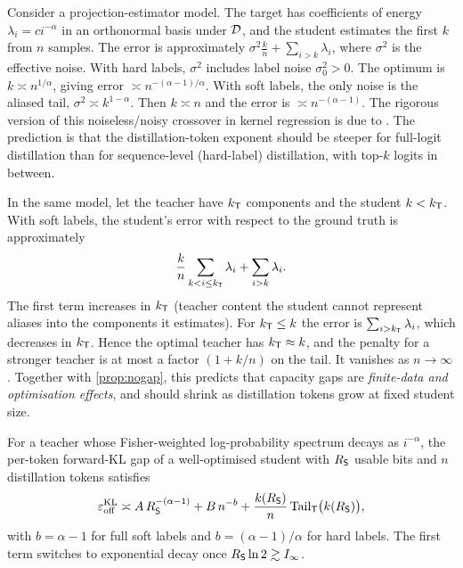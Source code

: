 \begin{heuristic}\label{heur:data}
Consider a projection-estimator model. The target has coefficients of energy $\lambda_i=ci^{-\alpha}$ in
an orthonormal basis under $\mathcal{D}$, and the student estimates the first $k$ from $n$ samples. The error is
approximately $\sigma^2\frac kn+\sum_{i>k}\lambda_i$, where $\sigma^2$ is the effective noise.
With hard labels, $\sigma^2$ includes label noise $\sigma^2_0>0$. The optimum is $k\asymp n^{1/\alpha}$, giving
error $\asymp n^{-(\alpha-1)/\alpha}$.
With soft labels, the only noise is the aliased tail, $\sigma^2\asymp k^{1-\alpha}$. Then $k\asymp n$ and the
error is $\asymp n^{-(\alpha-1)}$.
The rigorous version of this noiseless/noisy crossover in kernel regression is due to
\citet{cui2021generalization}. The prediction is that the distillation-token exponent should be
steeper for full-logit distillation than for sequence-level (hard-label) distillation, with top-$k$
logits in between.
\end{heuristic}

\begin{heuristic}\label{heur:gap}
In the same model, let the teacher have $k_{\mathsf{T}}$ components and the student $k<k_{\mathsf{T}}$. With soft labels,
the student's error with respect to the ground truth is approximately
\[
\frac kn\sum_{k<i\le k_{\mathsf{T}}}\lambda_i+\sum_{i>k}\lambda_i .
\]
The first term increases in $k_{\mathsf{T}}$ (teacher content the student cannot represent aliases into the
components it estimates). For $k_{\mathsf{T}}\le k$ the error is $\sum_{i>k_{\mathsf{T}}}\lambda_i$, which decreases in $k_{\mathsf{T}}$.
Hence the optimal teacher has $k_{\mathsf{T}}\approx k$, and the penalty for a stronger teacher is at most a factor
$(1+k/n)$ on the tail. It vanishes as $n\to\infty$. Together with \cref{prop:nogap}, this predicts that
capacity gaps are \emph{finite-data and optimisation effects}, and should shrink as distillation tokens
grow at fixed student size.
\end{heuristic}

\begin{conjecture}\label{conj:law}
For a teacher whose Fisher-weighted log-probability spectrum decays as $i^{-\alpha}$, the per-token
forward-KL gap of a well-optimised student with $R_{\mathsf{S}}$ usable bits and $n$ distillation tokens satisfies
\[
\varepsilon_{\mathrm{off}}^{\mathrm{KL}}\asymp A\,R_{\mathsf{S}}^{-(\alpha-1)}+B\,n^{-b}+\frac{k(R_{\mathsf{S}})}n\,\mathrm{Tail}_{\mathsf{T}}\big(k(R_{\mathsf{S}})\big),
\]
with $b=\alpha-1$ for full soft labels and $b=(\alpha-1)/\alpha$ for hard labels. The first term switches
to exponential decay once $R_{\mathsf{S}}\ln2\gtrsim I_\infty$.
\end{conjecture}

